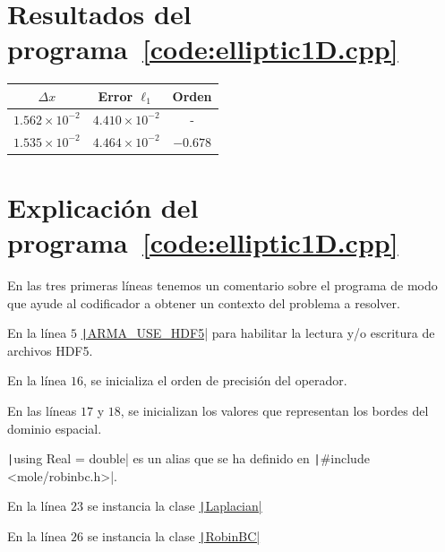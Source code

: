 \begin{problem}
\section*{Resultados del programa~\ref{code:elliptic1D.cpp}}

\begin{table}[ht!]
    \centering
    \begin{tabular}{ccc}
        \toprule
        $\Delta x$            & Error $\ell_1$        & Orden    \\
        \midrule
        $1.562\times 10^{-2}$ & $4.410\times 10^{-2}$ & -        \\
        $1.535\times 10^{-2}$ & $4.464\times 10^{-2}$ & $-0.678$ \\
        \bottomrule
    \end{tabular}
    \label{table:errors}
\end{table}


\section*{Explicación del programa~\ref{code:elliptic1D.cpp}}

En las tres primeras líneas tenemos un comentario sobre el programa
de modo que ayude al codificador a obtener un contexto del problema a
resolver.

En la línea $5$
\href{https://arma.sourceforge.net/docs.html#config_hpp}{\texttt|ARMA_USE_HDF5|}
para habilitar la lectura y/o escritura de archivos HDF5.

En la línea $16$, se inicializa el orden de precisión del operador.

En las líneas $17$ y $18$, se inicializan los valores que representan
los bordes del dominio espacial.

\texttt|using Real = double| es un alias que se ha definido
en \texttt|#include <mole/robinbc.h>|.

En la línea $23$ se instancia la clase \href{https://carlosal1015.github.io/mole_examples/api_docs/cpp/html/classLaplacian.html}{\texttt|Laplacian|}

En la línea $26$ se instancia la clase \href{https://carlosal1015.github.io/mole_examples/api_docs/cpp/html/classRobinBC.html}{\texttt|RobinBC|}


\end{problem}
